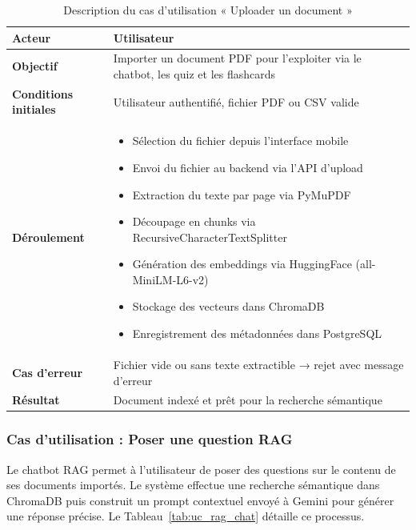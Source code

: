 \begin{table}[H]
\centering
\renewcommand{\arraystretch}{1.2}
\begin{tabular}{|p{4cm}|p{10cm}|}
\hline
\textbf{Acteur} & Utilisateur \\ \hline

\textbf{Objectif} & Importer un document PDF pour l'exploiter via le chatbot, les quiz et les flashcards \\ \hline

\textbf{Conditions initiales} & Utilisateur authentifié, fichier PDF ou CSV valide \\ \hline

\textbf{Déroulement} &
\begin{itemize}
    \item Sélection du fichier depuis l'interface mobile
    \item Envoi du fichier au backend via l'API d'upload
    \item Extraction du texte par page via PyMuPDF
    \item Découpage en chunks via RecursiveCharacterTextSplitter
    \item Génération des embeddings via HuggingFace (all-MiniLM-L6-v2)
    \item Stockage des vecteurs dans ChromaDB
    \item Enregistrement des métadonnées dans PostgreSQL
\end{itemize} \\ \hline

\textbf{Cas d'erreur} & Fichier vide ou sans texte extractible → rejet avec message d'erreur \\ \hline

\textbf{Résultat} & Document indexé et prêt pour la recherche sémantique \\ \hline
\end{tabular}
\caption{Description du cas d'utilisation « Uploader un document »}
\label{tab:uc_upload}
\end{table}

\subsubsection{Cas d'utilisation : Poser une question RAG}

Le chatbot RAG permet à l'utilisateur de poser des questions sur le contenu de ses documents importés. Le système effectue une recherche sémantique dans ChromaDB puis construit un prompt contextuel envoyé à Gemini pour générer une réponse précise. Le Tableau~\ref{tab:uc_rag_chat} détaille ce processus.

